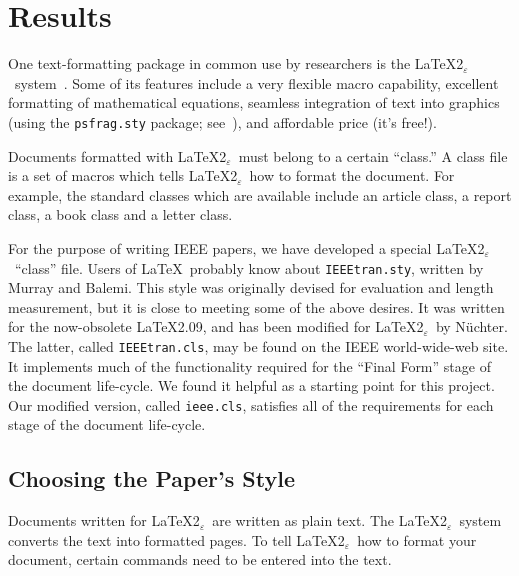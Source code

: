\documentclass[%
	final,
	notitlepage,
	narroweqnarray,
	inline,
	twoside,
	]{ieee}
\newcommand{\latexiie}{\LaTeX2{\Large$_\varepsilon$}}
\begin{document}
\section{Results}
\label{sec:Results}

One text-formatting package in common use by researchers is the
\latexiie\ system~\cite{lamport}. Some of its features include a very
flexible macro capability, excellent formatting of mathematical
equations, seamless integration of text into graphics (using the
\texttt{psfrag.sty} package; see~\cite{goossens}), and affordable
price (it's free!).

Documents formatted with \latexiie\ must belong to a certain ``class.''
A class file is a set of macros which tells \latexiie\ how to format
the document. For example, the standard classes which are available
include an article class, a report class, a book class and a letter
class.

For the purpose of writing IEEE papers, we have developed a special
\latexiie\ ``class'' file. Users of \LaTeX\ probably know about
\texttt{IEEEtran.sty}, written by Murray and Balemi. This style was 
originally devised for evaluation and length measurement, but it is
close to meeting some of the above desires. It was written for the
now-obsolete \LaTeX 2.09, and has been modified for \latexiie\ by
N\"{u}chter. The latter, called \texttt{IEEEtran.cls}, may be found on
the IEEE world-wide-web site.  It implements much of the functionality
required for the ``Final Form'' stage of the document life-cycle. We
found it helpful as a starting point for this project. Our modified
version, called \texttt{ieee.cls}, satisfies all of the requirements
for each stage of the document life-cycle.

\subsection{Choosing the Paper's Style}

Documents written for \latexiie\ are written as plain text. The
\latexiie\ system converts the text into formatted pages. To tell
\latexiie\ how to format your document, certain commands need to be
entered into the text.
\end{document}
